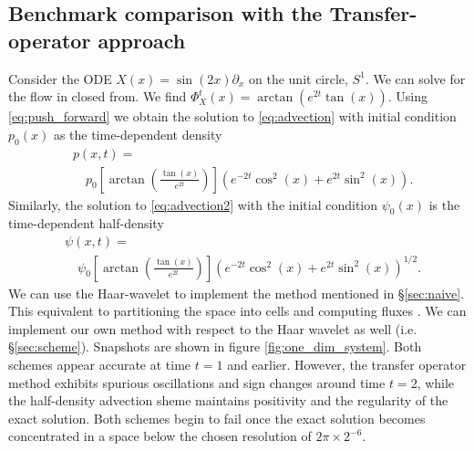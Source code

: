 \documentclass[letterpaper, 10 pt, conference]{ieeeconf}
\begin{document}
\subsection{Benchmark comparison with the Transfer-operator approach}
Consider the ODE $X(x) = \sin(2x) \partial_x$ on the unit circle, $S^1$.
We can solve for the flow in closed from.  We find
$\Phi_X^t(x) = \arctan( e^{2t} \tan(x) )$.
Using \eqref{eq:push_forward}
we obtain the solution to \eqref{eq:advection} with initial condition $p_0(x)$ as the time-dependent density
\begin{align*}
  &p(x,t) = \\
  &\quad p_0\left[ \arctan \left( \frac{ \tan(x)}{e^{2t}} \right)\right]
  \left( e^{-2t} \cos^2(x) + e^{2t} \sin^2(x) \right).
\end{align*}
Similarly, the solution to \eqref{eq:advection2} with the initial condition $\psi_0(x)$ is the time-dependent half-density
\begin{align*}
  &\psi(x,t) = \\
  &\quad \psi_0\left[\arctan\left( \frac{ \tan(x)}{e^{2t}} \right) \right]
  \left( e^{-2t} \cos^2(x) + e^{2t} \sin^2(x) \right)^{1/2}. 
\end{align*}
We can use the Haar-wavelet to implement the method mentioned in \S \ref{sec:naive}.  This equivalent to partitioning the space into cells and computing fluxes \cite{FroylandJungeKoltai2013}.  We can implement our own method with respect to the Haar wavelet as well (i.e. \S \ref{sec:scheme}).  Snapshots are shown in figure \ref{fig:one_dim_system}.
Both schemes appear accurate at time $t=1$ and earlier.
However, the transfer operator method exhibits spurious oscillations and sign changes around time $t=2$,
 while the half-density advection sheme maintains positivity and the regularity of the exact solution.
Both schemes begin to fail once the exact solution becomes concentrated in a space below the chosen resolution of $2\pi \times 2^{-6}$.
\end{document}
